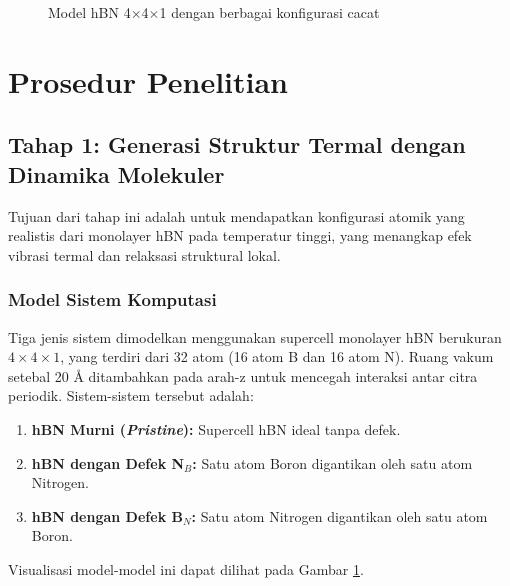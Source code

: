 \begin{figure}[H]
    \caption{Model hBN 4$\times$4$\times$1 dengan berbagai konfigurasi cacat}
    \label{fig:struktur_hBN_4x4x1}
\end{figure}

\section{Prosedur Penelitian}

\subsection{Tahap 1: Generasi Struktur Termal dengan Dinamika Molekuler}
Tujuan dari tahap ini adalah untuk mendapatkan konfigurasi atomik yang realistis dari monolayer hBN pada temperatur tinggi, yang menangkap efek vibrasi termal dan relaksasi struktural lokal.

\subsubsection{Model Sistem Komputasi}
Tiga jenis sistem dimodelkan menggunakan supercell monolayer hBN berukuran $4 \times 4 \times 1$, yang terdiri dari 32 atom (16 atom B dan 16 atom N). Ruang vakum setebal 20 Å ditambahkan pada arah-z untuk mencegah interaksi antar citra periodik. Sistem-sistem tersebut adalah:
\begin{enumerate}
    \item \textbf{hBN Murni (\textit{Pristine}):} Supercell hBN ideal tanpa defek.
    \item \textbf{hBN dengan Defek N$_B$:} Satu atom Boron digantikan oleh satu atom Nitrogen.
    \item \textbf{hBN dengan Defek B$_N$:} Satu atom Nitrogen digantikan oleh satu atom Boron.
\end{enumerate}
Visualisasi model-model ini dapat dilihat pada Gambar \ref{fig:struktur_hBN_4x4x1}.


